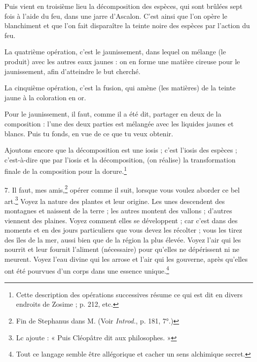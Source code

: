 \documentclass[a4paper, 11pt, oneside, polutonikogreek, french]{article}
\begin{document}
Puis vient en troisième lieu la décomposition des espèces, qui sont brûlées sept fois à l'aide du feu, dans une jarre d'Ascalon. C'est ainsi que l'on opère le blanchiment et que l'on fait disparaître la teinte noire des espèces par l'action du feu.

La quatrième opération, c'est le jaunissement, dans lequel on mélange (le produit) avec les autres eaux jaunes : on en forme une matière cireuse pour le jaunissement, afin d'atteindre le but cherché.

La cinquième opération, c'est la fusion, qui amène (les matières) de la teinte jaune à la coloration en or.

Pour le jaunissement, il faut, comme il a été dit, partager en deux de la composition : l'une des deux parties est mélangée avec les liquides jaunes et blancs. Puis tu fonds, en vue de ce que tu veux obtenir.

Ajoutons encore que la décomposition est une iosis ; c'est l'iosis des espèces ; c'est-à-dire que par l'iosis et la décomposition, (on réalise) la transformation finale de la composition pour la dorure.\footnote{Cette description des opérations successives résume ce qui est dit en divers endroits de Zosime ; p. 212, etc.}

7. Il faut, mes amis,\footnote{Fin de Stephanus dans M. (Voir \emph{Introd.}, p. 181, 7°.)} opérer comme il suit, lorsque vous voulez aborder ce bel art.\footnote{Lc ajoute : « Puis Cléopâtre dit aux philosophes. »} Voyez la nature des plantes et leur origine. Les unes descendent des montagnes et naissent de la terre ; les autres montent des vallons ; d'autres viennent des plaines. Voyez comment elles se développent ; car c'est dans des moments et en des jours particuliers que vous devez les récolter ; vous les tirez des îles de la mer, aussi bien que de la région la plus élevée. Voyez l'air qui les nourrit et leur fournit l'aliment (nécessaire) pour qu'elles ne dépérissent ni ne meurent. Voyez l'eau divine qui les arrose et l'air qui les gouverne, après qu'elles ont été pourvues d'un corps dans une essence unique.\footnote{Tout ce langage semble être allégorique et cacher un sens alchimique secret.}
\end{document}
